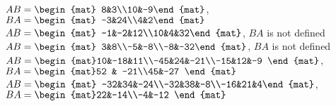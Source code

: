 \begin{Answer}
\Question $AB = \begin{mat} 8&3\\10&-9\end{mat}$, $BA = \begin{mat} -3&24\\4&2\end{mat}$
\Question $AB = \begin{mat} -1&-2&12\\10&4&32\end{mat}$, $BA$ is not defined
\Question $AB = \begin{mat} 3&8\\-5&-8\\-8&-32\end{mat}$, $BA$ is not defined
\Question $AB = \begin{mat}10&-18&11\\-45&24&-21\\-15&12&-9 \end{mat}$, $BA = \begin{mat}52 & -21\\45&-27 \end{mat}$
\Question $AB = \begin{mat} -32&34&-24\\-32&38&-8\\-16&21&4\end{mat}$, $BA = \begin{mat}22&-14\\-4&-12 \end{mat}$

\end{Answer}
